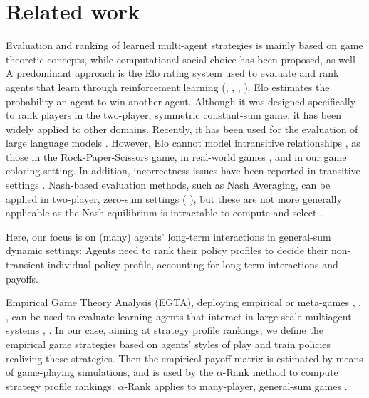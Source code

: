 \section{Related work}
Evaluation and ranking of learned multi-agent strategies is mainly based on game theoretic concepts, while computational social choice has been proposed, as well \cite{lanctot2023evaluating}.
A predominant approach is the Elo rating system used to evaluate and rank agents that learn through reinforcement learning (\cite{elo1978rating}, \cite{silver2016mastering}, \cite{doi:10.1126/science.aar6404}, \cite{mnih2015human}). Elo estimates the probability an agent to win another agent. Although it was designed specifically to rank players in the two-player, symmetric constant-sum game, it has been widely applied to other domains. Recently, it has been used for the evaluation of large language models \cite{10.5555/3666122.3668142}. However, Elo cannot model intransitive relationships \cite{DBLP:conf/nips/BalduzziTPG18}, as those in the Rock-Paper-Scissors game, in real-world games \cite{NEURIPS2020_ca172e96}, and in our game coloring setting. In addition, incorrectness issues have been reported in transitive settings \cite{pmlr-v206-bertrand23a}. Nash-based evaluation methods, such as Nash Averaging, can be applied in two-player, zero-sum settings (\cite{DBLP:conf/nips/BalduzziTPG18} \cite{10.5555/3237383.3237402}), but these are not more generally applicable as the Nash equilibrium is intractable to compute and select \cite{10.1145/1132516.1132527}.

Here, our focus is on (many) agents' long-term interactions in general-sum dynamic settings: Agents need to rank their policy profiles to decide their non-transient individual policy profile, accounting for long-term interactions and payoffs. 

Empirical Game Theory Analysis (EGTA), deploying empirical or meta-games \cite{10.1007/11575726_8} \cite{tuyls2007evolutionary},  \cite{gerald2002analyzing}, \cite{wellman2006methods}, can be used to evaluate learning agents that interact in large-scale multiagent systems \cite{omidshafiei2019alpharank}, \cite{tuyls2018generalised} \cite{tuyls2018symmetric}. In our case, aiming at strategy profile rankings, we define the empirical game strategies based on agents' styles of play and train policies realizing these strategies. Then the empirical payoff matrix is estimated by means of game-playing simulations, and is used by the $\alpha$-Rank method to compute strategy profile rankings. $\alpha$-Rank applies to many-player, general-sum games \cite{omidshafiei2019alpharank}.



